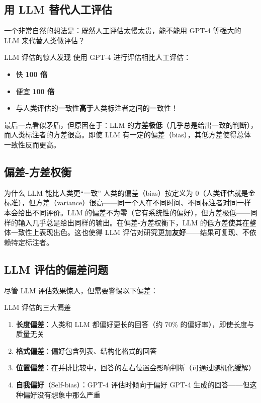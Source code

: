 \documentclass[a4paper]{article}
\begin{document}
\subsection{用 LLM 替代人工评估}

一个非常自然的想法是：既然人工评估太慢太贵，能不能用 GPT-4 等强大的 LLM 来代替人类做评估？





\begin{importantbox}{LLM 评估的惊人发现}
使用 GPT-4 进行评估相比人工评估：
\begin{itemize}
    \item 快 \textbf{100 倍}
    \item 便宜 \textbf{100 倍}
    \item 与人类评估的一致性\textbf{高于}人类标注者之间的一致性！
\end{itemize}
最后一点看似矛盾，但原因在于：LLM 的\textbf{方差极低}（几乎总是给出一致的判断），而人类标注者的方差很高。即使 LLM 有一定的偏差（bias），其低方差使得总体一致性反而更高。
\end{importantbox}

\subsection{偏差-方差权衡}





\begin{knowledgebox}{为什么 LLM 能比人类更``一致''}
人类的偏差（bias）按定义为 0（人类评估就是金标准），但方差（variance）很高——同一个人在不同时间、不同标注者对同一样本会给出不同评价。LLM 的偏差不为零（它有系统性的偏好），但方差极低——同样的输入几乎总是给出同样的输出。在偏差-方差权衡下，LLM 的低方差使其在整体一致性上表现出色。这也使得 LLM 评估对研究更加\textbf{友好}——结果可复现、不依赖特定标注者。
\end{knowledgebox}

\subsection{LLM 评估的偏差问题}

尽管 LLM 评估效果惊人，但需要警惕以下偏差：





\begin{warningbox}{LLM 评估的三大偏差}
\begin{enumerate}
    \item \textbf{长度偏差}：人类和 LLM 都偏好更长的回答（约 70\% 的偏好率），即使长度与质量无关
    \item \textbf{格式偏差}：偏好包含列表、结构化格式的回答
    \item \textbf{位置偏差}：在并排比较中，回答的左右位置会影响判断（可通过随机化缓解）
    \item \textbf{自我偏好}（Self-bias）：GPT-4 评估时倾向于偏好 GPT-4 生成的回答——但这种偏好没有想象中那么严重
\end{enumerate}
\end{warningbox}
\end{document}
